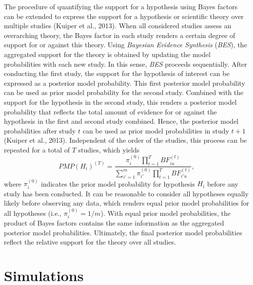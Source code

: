 \documentclass[
]{interact}
\begin{document}
The procedure of quantifying the support for a hypothesis using Bayes
factors can be extended to express the support for a hypothesis or
scientific theory over multiple studies (Kuiper et al., 2013). When all
considered studies assess an overarching theory, the Bayes factor in
each study renders a certain degree of support for or against this
theory. Using \emph{Bayesian Evidence Synthesis} (\emph{BES}), the
aggregated support for the theory is obtained by updating the model
probabilities with each new study. In this sense, \emph{BES} proceeds
sequentially. After conducting the first study, the support for the
hypothesis of interest can be expressed as a posterior model
probability. This first posterior model probability can be used as prior
model probability for the second study. Combined with the support for
the hypothesis in the second study, this renders a posterior model
probability that reflects the total amount of evidence for or against
the hypothesis in the first and second study combined. Hence, the
posterior model probabilities after study \(t\) can be used as prior
model probabilities in study \(t + 1\) (Kuiper et al., 2013).
Independent of the order of the studies, this process can be repeated
for a total of \(T\) studies, which yields \[
PMP(H_i)^{(T)} = \frac{
  \pi^{(0)}_{i} \prod^T_{t=1} BF^{(t)}_{iu}
}{
  \sum^m_{i'=1} \pi^{(0)}_{i'} \prod^T_{t=1} BF^{(t)}_{i'u}
                          },
                          \] where \(\pi^{(0)}_i\) indicates the prior model probability for
hypothesis \(H_i\) before any study has been conducted. It can be
reasonable to consider all hypotheses equally likely before observing
any data, which renders equal prior model probabilities for all
hypotheses (i.e., \(\pi^{(0)}_i = 1/m\)). With equal prior model
probabilities, the product of Bayes factors contains the same
information as the aggregated posterior model probabilities. Ultimately,
the final posterior model probabilities reflect the relative support for
the theory over all studies.

\hypertarget{simulations}{%
  \section{Simulations}\label{simulations}}
\end{document}
